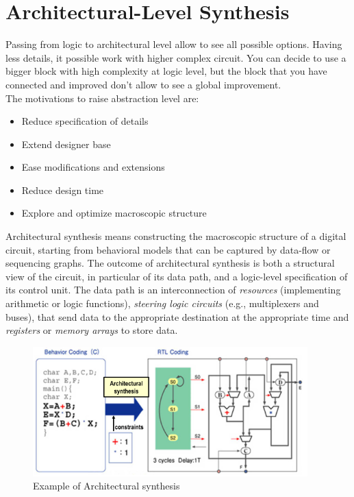 \section{Architectural-Level Synthesis}
Passing from logic to architectural level allow to see all possible options. Having less details, it possible work with higher complex circuit. You can decide to use a bigger block with high complexity at logic level, but the block that you have connected and improved don't allow to see a global improvement.\\
The motivations to raise abstraction level are:
\begin{itemize}
\item Reduce specification of details
\item Extend designer base
\item Ease modifications and extensions
\item Reduce design time
\item Explore and optimize macroscopic structure
\end{itemize}
Architectural synthesis means constructing the macroscopic structure of a digital circuit, starting from behavioral models that can be captured by data-flow or sequencing graphs. The outcome of architectural synthesis is both a structural view of the circuit, in particular of its data path, and a logic-level specification of its control unit. The data path is an interconnection of  \textit{resources} (implementing arithmetic or logic functions), \textit{steering logic circuits}  (e.g., multiplexers and buses), that send data to the appropriate destination at the appropriate time and  \textit{registers}  or  \textit{memory arrays}  to store data.
\begin{figure}[H]
	 \centering
	 \includegraphics[height=50mm]{./Cap3/Images/Image01.png}
	 \caption[Optional caption]{Example of Architectural synthesis}
	 \label{fig:archSy}
\end{figure}

